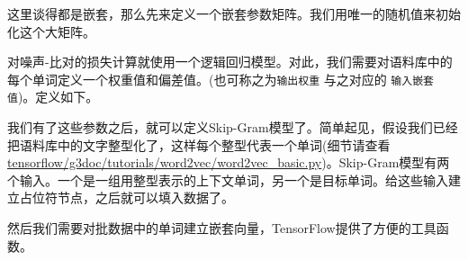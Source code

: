 这里谈得都是嵌套，那么先来定义一个嵌套参数矩阵。我们用唯一的随机值来初始化这个大矩阵。

\begin{Shaded}
\begin{Highlighting}[]
\OperatorTok{=} 
    \OperatorTok{-}\NormalTok{, }\NormalTok{))}
\end{Highlighting}
\end{Shaded}

对噪声-比对的损失计算就使用一个逻辑回归模型。对此，我们需要对语料库中的每个单词定义一个权重值和偏差值。(也可称之为\texttt{输出权重}
与之对应的 \texttt{输入嵌套值})。定义如下。

\begin{Shaded}
\begin{Highlighting}[]
\OperatorTok{=} 
                      \OperatorTok{=} \OperatorTok{/} 
\OperatorTok{=} 
\end{Highlighting}
\end{Shaded}

我们有了这些参数之后，就可以定义Skip-Gram模型了。简单起见，假设我们已经把语料库中的文字整型化了，这样每个整型代表一个单词(细节请查看
\href{https://tensorflow.googlesource.com/tensorflow/+/master/tensorflow/g3doc/tutorials/word2vec/word2vec_basic.py}{tensorflow/g3doc/tutorials/word2vec/word2vec\_basic.py})。Skip-Gram模型有两个输入。一个是一组用整型表示的上下文单词，另一个是目标单词。给这些输入建立占位符节点，之后就可以填入数据了。

\begin{Shaded}
\begin{Highlighting}[]
\OperatorTok{=} \OperatorTok{=}
\OperatorTok{=} \OperatorTok{=}\NormalTok{[batch_size, }\NormalTok{])}
\end{Highlighting}
\end{Shaded}

然后我们需要对批数据中的单词建立嵌套向量，TensorFlow提供了方便的工具函数。

